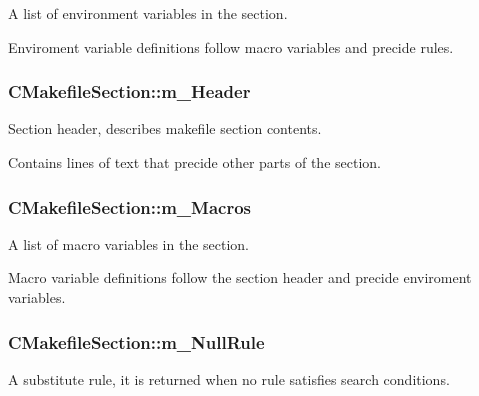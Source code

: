 A list of environment variables in the section. 

Enviroment variable definitions follow macro variables and precide rules. \hypertarget{classCMakefileSection_a19aff76a974cefa540960369eaed43ec}{
\subsubsection[{m\-\_\-\-Header}]{\setlength{\rightskip}{0pt plus 5cm}C\-Makefile\-Section\-::m\-\_\-\-Header\hspace{0.3cm}{\ttfamily [private]}}}\label{classCMakefileSection_a19aff76a974cefa540960369eaed43ec}


Section header, describes makefile section contents. 

Contains lines of text that precide other parts of the section. \hypertarget{classCMakefileSection_a77768b7c6c3acb031990ebcbae9957de}{
\subsubsection[{m\-\_\-\-Macros}]{\setlength{\rightskip}{0pt plus 5cm}C\-Makefile\-Section\-::m\-\_\-\-Macros\hspace{0.3cm}{\ttfamily [private]}}}\label{classCMakefileSection_a77768b7c6c3acb031990ebcbae9957de}


A list of macro variables in the section. 

Macro variable definitions follow the section header and precide enviroment variables. \hypertarget{classCMakefileSection_a30793048110e7a747f5b142bec3143a7}{
\subsubsection[{m\-\_\-\-Null\-Rule}]{\setlength{\rightskip}{0pt plus 5cm}C\-Makefile\-Section\-::m\-\_\-\-Null\-Rule\hspace{0.3cm}{\ttfamily [private]}}}\label{classCMakefileSection_a30793048110e7a747f5b142bec3143a7}


A substitute rule, it is returned when no rule satisfies search conditions. 

